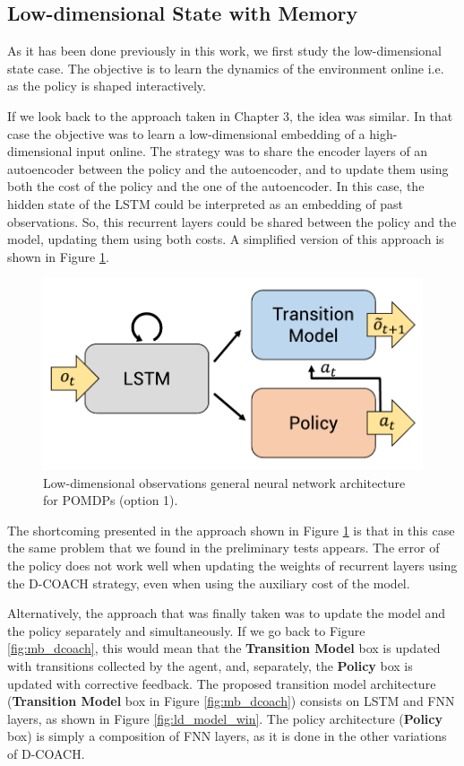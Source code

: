\newpage

\subsection{Low-dimensional State with Memory}
\label{sec:ld_memory}
As it has been done previously in this work, we first study the low-dimensional state case. The objective is to learn the dynamics of the environment online i.e. as the policy is shaped interactively. 

If we look back to the approach taken in Chapter 3, the idea was similar. In that case the objective was to learn a low-dimensional embedding of a high-dimensional input online. The strategy was to share the encoder layers of an autoencoder between the policy and the autoencoder, and to update them using both the cost of the policy and the one of the autoencoder. In this case, the hidden state of the LSTM could be interpreted as an embedding of past observations. So, this recurrent layers could be shared between the policy and the model, updating them using both costs. A simplified version of this approach is shown in Figure \ref{fig:ld_model_rip}.

\begin{figure}[h]
    \centering
    \includegraphics[width=0.6\linewidth]{imagenes/cap4/ld_model_rip.pdf}
    \caption{Low-dimensional observations general neural network architecture for POMDPs (option 1).}
    \label{fig:ld_model_rip}
\end{figure}

The shortcoming presented in the approach shown in Figure \ref{fig:ld_model_rip} is that in this case the same problem that we found in the preliminary tests appears. The error of the policy does not work well when updating the weights of recurrent layers using the D-COACH strategy, even when using the auxiliary cost of the model. 

Alternatively, the approach that was finally taken was to update the model and the policy separately and simultaneously. If we go back to Figure \ref{fig:mb_dcoach}, this would mean that the \textbf{Transition Model} box is updated with transitions collected by the agent, and, separately, the \textbf{Policy} box is updated with corrective feedback. The proposed transition model architecture (\textbf{Transition Model} box in Figure \ref{fig:mb_dcoach}) consists on LSTM and FNN layers, as shown in Figure \ref{fig:ld_model_win}. The policy architecture (\textbf{Policy} box) is simply a composition of FNN layers, as it is done in the other variations of D-COACH.

